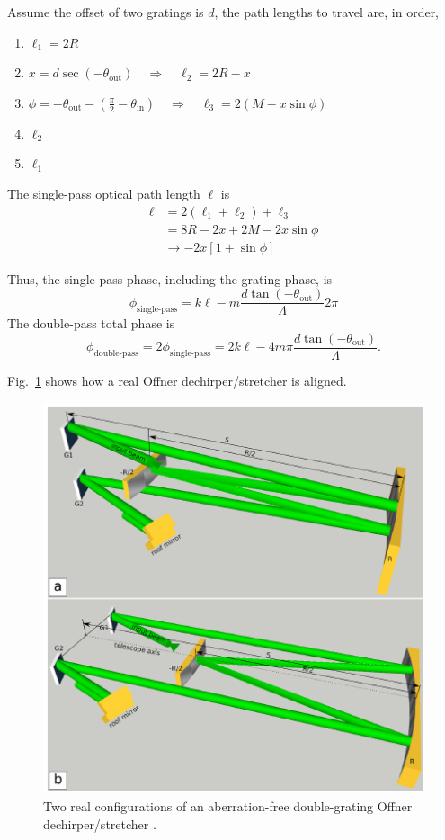 \documentclass[12pt,hidelinks]{book}
\begin{document}
Assume the offset of two gratings is $d$, the path lengths to travel are, in order,
\begin{enumerate}
\item $\ell_1=2R$
\item $x=d\sec(-\theta_{\text{out}})\quad\Rightarrow\quad \ell_2=2R-x$
\item $\phi=-\theta_{\text{out}}-\left(\frac{\pi}{2}-\theta_{\text{in}}\right)\quad\Rightarrow\quad\ell_3=2\left(M-x\sin\phi\right)$
\item $\ell_2$
\item $\ell_1$
\end{enumerate}

The single-pass optical path length $\ell$ is
\begin{align}
\ell & =2\left(\ell_1+\ell_2\right)+\ell_3 \nonumber \\
& =8R-2x+2M-2x\sin\phi \nonumber \\
& \rightarrow-2x\left[1+\sin\phi\right]
\end{align}

Thus, the single-pass phase, including the grating phase, is
\begin{equation}
\phi_{\text{single-pass}}=k\ell-m\frac{d\tan(-\theta_{\text{out}})}{\Lambda}2\pi
\end{equation}
The double-pass total phase is
\begin{equation}
\phi_{\text{double-pass}}=2\phi_{\text{single-pass}}=2k\ell-4m\pi\frac{d\tan(-\theta_{\text{out}})}{\Lambda}.
\end{equation}

Fig.~\ref{fig:real_aberration-free-Offner} shows how a real Offner dechirper/stretcher is aligned.
\begin{figure}[!ht]
\centering
\includegraphics[width=.7\textwidth]{Offner_stretcher_real_design.png}
\caption{Two real configurations of an aberration-free double-grating Offner dechirper/stretcher \cite{Shvydkoy2020}.}
\label{fig:real_aberration-free-Offner}
\end{figure}

\clearpage

\printbibliography
\end{document}
